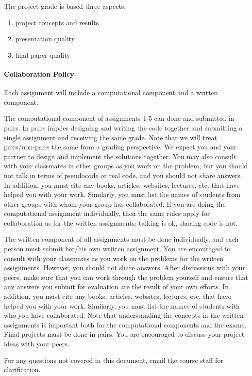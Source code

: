\documentclass[11pt]{article}
\begin{document}
The project grade is based three aspects: 
\begin{enumerate}
\item project concepts and results 
\item presentation quality 
\item final paper quality 
\end{enumerate}

\paragraph{Collaboration Policy}

Each assignment will include a computational component and a written component.

The computational component of assignments 1-5 can done and submitted
in pairs. In pairs implies designing and writing the code together and
submitting a single assignment and receiving the same grade. Note that
we will treat pairs/non-pairs the same from a grading perspective.  We
expect you and your partner to design and implement the solutions
together. You may also consult with your classmates in other groups as
you work on the problem, but you should not talk in terms of
pseudocode or real code, and you should not share answers. In
addition, you must cite any books, articles, websites, lectures,
etc. that have helped you with your work. Similarly, you must list the
names of students from other groups with whom your group has
collaborated. If you are doing the computational assignment
individually, then the same rules apply for collaboration as for the
written assignments: talking is ok, sharing code is not.

The written component of all assignments must be done individually,
and each person must submit her/his own written assignment. You are
encouraged to consult with your classmates as you work on the problems
for the written assignments. However, you should not share answers.
After discussions with your peers, make sure that you can work through
the problem yourself and ensure that any answers you submit for
evaluation are the result of your own efforts. In addition, you must
cite any books, articles, websites, lectures, etc. that have helped
you with your work. Similarly, you must list the names of students
with who you have collaborated.  Note that understanding the concepts
in the written assignments is important both for the computational
components and the exams. Final projects must be done in pairs. You
are encouraged to discuss your project ideas with your peers.

For any questions not covered in this document, email the course staff
for clarification.
\end{document}
